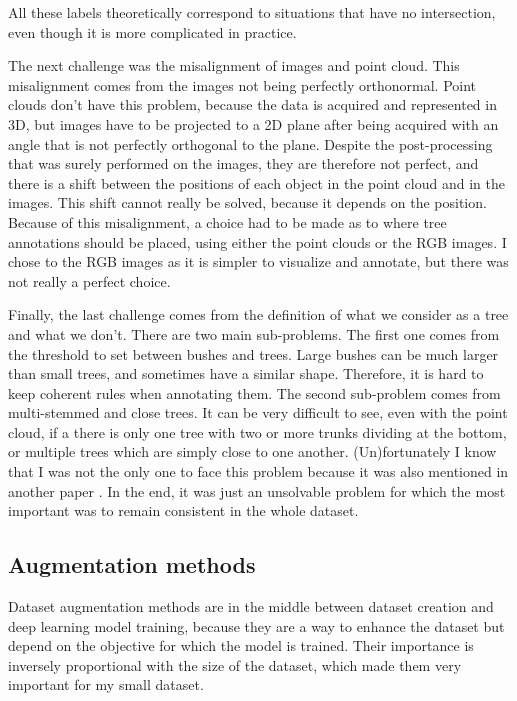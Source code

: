 \documentclass[
  letterpaper,
  DIV=11,
  numbers=noendperiod]{scrartcl}
\begin{document}
All these labels theoretically correspond to situations that have no
intersection, even though it is more complicated in practice.

The next challenge was the misalignment of images and point cloud. This
misalignment comes from the images not being perfectly orthonormal.
Point clouds don't have this problem, because the data is acquired and
represented in 3D, but images have to be projected to a 2D plane after
being acquired with an angle that is not perfectly orthogonal to the
plane. Despite the post-processing that was surely performed on the
images, they are therefore not perfect, and there is a shift between the
positions of each object in the point cloud and in the images. This
shift cannot really be solved, because it depends on the position.
Because of this misalignment, a choice had to be made as to where tree
annotations should be placed, using either the point clouds or the RGB
images. I chose to the RGB images as it is simpler to visualize and
annotate, but there was not really a perfect choice.

Finally, the last challenge comes from the definition of what we
consider as a tree and what we don't. There are two main sub-problems.
The first one comes from the threshold to set between bushes and trees.
Large bushes can be much larger than small trees, and sometimes have a
similar shape. Therefore, it is hard to keep coherent rules when
annotating them. The second sub-problem comes from multi-stemmed and
close trees. It can be very difficult to see, even with the point cloud,
if a there is only one tree with two or more trunks dividing at the
bottom, or multiple trees which are simply close to one another.
(Un)fortunately I know that I was not the only one to face this problem
because it was also mentioned in another paper
\autocite{DeepForestBefore}. In the end, it was just an unsolvable
problem for which the most important was to remain consistent in the
whole dataset.

\subsection{Augmentation methods}\label{augmentation-methods}

Dataset augmentation methods are in the middle between dataset creation
and deep learning model training, because they are a way to enhance the
dataset but depend on the objective for which the model is trained.
Their importance is inversely proportional with the size of the dataset,
which made them very important for my small dataset.
\end{document}
